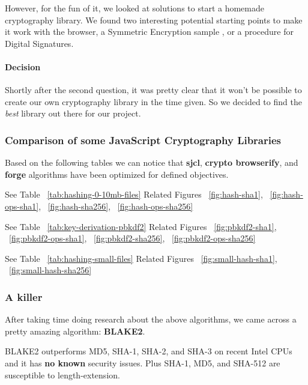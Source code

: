 However, for the fun of it, we looked at solutions to start a homemade cryptography library. We found two interesting potential starting points to make it work with the browser, a Symmetric Encryption sample \cite{InfoTech2014SymmetricSample}, or a procedure for Digital Signatures\cite{InfoTech2014DigitalBrowser}.

\paragraph{Decision} Shortly after the second question, it was pretty clear that it won't be possible to create our own cryptography library in the time given. So we decided to find the \textit{best} library out there for our project.

\subsubsection{Comparison of some JavaScript Cryptography Libraries}

Based on the following tables we can notice that \textbf{sjcl}\cite{Stark2012SymmetricJavascript}, \textbf{crypto browserify}\cite{Tarr2013Crypto-Browserify}, and \textbf{forge}\cite{DigitalBazaar2016Forge} algorithms have been optimized for defined objectives.

See Table ~\ref{tab:hashing-0-10mb-files}
Related Figures ~\ref{fig:hash-sha1}, ~\ref{fig:hash-ops-sha1}, ~\ref{fig:hash-sha256}, ~\ref{fig:hash-ops-sha256}

See Table ~\ref{tab:key-derivation-pbkdf2}
Related Figures ~\ref{fig:pbkdf2-sha1}, ~\ref{fig:pbkdf2-ops-sha1}, ~\ref{fig:pbkdf2-sha256}, ~\ref{fig:pbkdf2-ops-sha256}

See Table ~\ref{tab:hashing-small-files}
Related Figures ~\ref{fig:small-hash-sha1}, ~\ref{fig:small-hash-sha256}

\subsubsection{A killer}

After taking time doing research about the above algorithms, we came across a pretty amazing algorithm: \textbf{BLAKE2}\cite{Guo2014AnalysisBLAKE2,SaarinenM-J.2015TheMAC}.

BLAKE2 outperforms MD5, SHA-1, SHA-2, and SHA-3 on recent Intel CPUs and it has \textbf{no known} security issues. Plus SHA-1, MD5, and SHA-512 are susceptible to length-extension.

